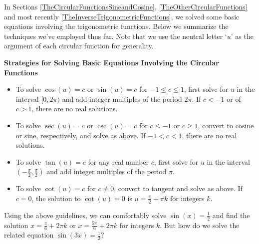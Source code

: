 \documentclass{ximera}
\begin{document}
	\author{Stitz-Zeager}




\setcounter{footnote}{0}

\label{TrigonometricEquationsandInequalities}

In Sections \ref{TheCircularFunctionsSineandCosine}, \ref{TheOtherCircularFunctions} and most recently \ref{TheInverseTrigonometricFunctions}, we solved some basic equations involving the trigonometric functions. Below we summarize the techniques we've employed thus far.  Note that we use the neutral letter `$u$' as the argument of each circular function for generality.

\smallskip

\label{trigeqnstrategy1}

\colorbox{ResultColor}{\bbm
\centerline{\textbf{Strategies for Solving Basic Equations Involving the Circular Functions}}

\smallskip

\begin{itemize}

\item To solve $\cos(u) = c$ or $\sin(u) = c$ for $-1 \leq c \leq 1$, first solve for $u$ in the interval $[0,2\pi)$ and add integer multiples of the period $2\pi$.  If $c < -1$ or of $c > 1$, there are no real solutions.

\item To solve $\sec(u) = c$ or $\csc(u) = c$ for $c \leq -1$ or $c \geq 1$,  convert to cosine or sine, respectively, and solve as above.  If $-1 < c < 1$, there are no real solutions.

\item To solve  $\tan(u) = c$ for any real number $c$,  first solve for $u$ in the interval $\left(-\frac{\pi}{2}, \frac{\pi}{2}\right)$ and add integer multiples of the period $\pi$.

\item  To solve  $\cot(u) = c$ for $c \neq 0$, convert to tangent and solve as above.  If $c = 0$, the solution to $\cot(u) = 0$ is $u = \frac{\pi}{2} + \pi k$ for integers $k$.

\end{itemize}

\smallskip

\ebm}

\smallskip

Using the above guidelines, we can comfortably solve $\sin(x) = \frac{1}{2}$ and find the solution $x = \frac{\pi}{6} + 2\pi k$ or $x = \frac{5\pi}{6} + 2\pi k$ for integers $k$.  But how do we solve the related equation $\sin(3x) = \frac{1}{2}$?
\end{document}
